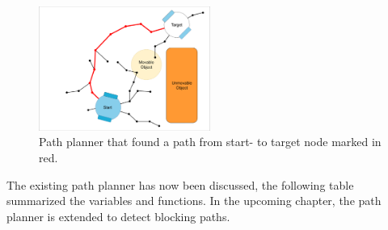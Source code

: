 \begin{figure}[H]
    \centering
    \includegraphics[width=0.5\textwidth, cfbox=my_grey 5pt 0pt]{figures/required_background/mp/7mp_path_found.drawio.png}
    \caption{Path planner that found a path from start- to target node marked in red.}
    \label{fig:motion_planner_adding_one_node_final}
\end{figure}

The existing path planner has now been discussed, the following table summarized the variables and functions. In the upcoming chapter, the path planner is extended to detect blocking paths.\bs

